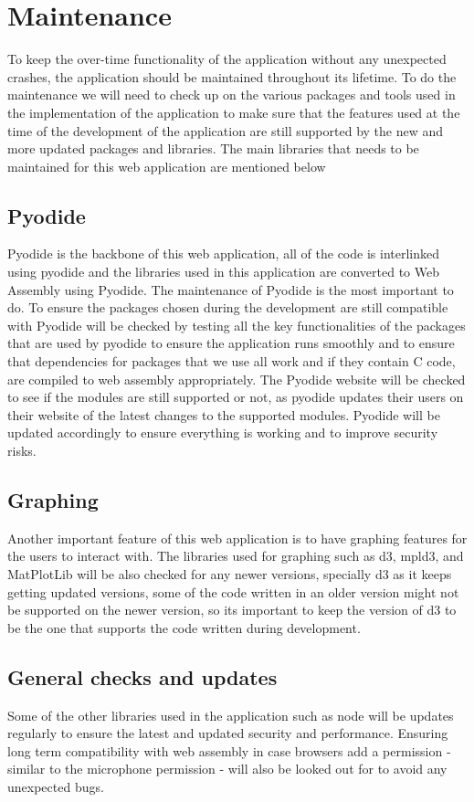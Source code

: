 \section{Maintenance}


To keep the over-time functionality of the application without any unexpected crashes, the application should be maintained throughout its lifetime. 
To do the maintenance we will need to check up on the various packages and tools used in the implementation of the application to make sure that the features used at the time of the development of 
the application are still supported by the new and more updated packages and libraries. The main libraries that needs to be maintained for this web application are mentioned below
\subsection{Pyodide}

Pyodide is the backbone of this web application, all of the code is interlinked using pyodide and the libraries used in this application are converted to Web Assembly using Pyodide. 
The maintenance of Pyodide is the most important to do. To ensure the packages chosen during the development are still compatible with Pyodide will be checked by testing all the key functionalities 
of the packages that are used by pyodide to ensure the application runs smoothly and to ensure that dependencies for packages that we use all work and if they contain C code, are compiled to web assembly appropriately.
The Pyodide website will be checked to see if the modules are still supported or not, as pyodide updates their users on their website of the latest changes to the supported modules. 
Pyodide will be updated accordingly to ensure everything is working and to improve security risks.

\subsection{Graphing}
Another important feature of this web application is to have graphing features for the users to interact with. 
The libraries used for graphing such as d3, mpld3, and MatPlotLib will be also checked for any newer versions, specially d3 as it keeps getting updated versions, some of the code written in an older version might not 
be supported on the newer version, so its important to keep the version of d3 to be the one that supports the code written during development.
\subsection{General checks and updates}
Some of the other libraries used in the application such as node will be updates regularly to ensure the latest and updated security and performance. 
Ensuring long term compatibility with web assembly in case browsers add a permission - similar to the microphone permission - will also be looked out for to avoid any unexpected bugs.